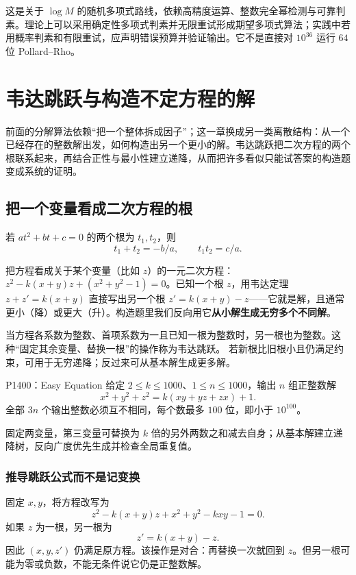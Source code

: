 \cost 这是关于 $\log M$ 的随机多项式路线，依赖高精度运算、整数完全幂检测与可靠判素。理论上可以采用确定性多项式判素并无限重试形成期望多项式算法；实践中若用概率判素和有限重试，应声明错误预算并验证输出。它不是直接对 $10^{36}$ 运行 $64$ 位 Pollard--Rho。



\chapter{韦达跳跃与构造不定方程的解}
\begin{chapterintro}[章节导读]
前面的分解算法依赖“把一个整体拆成因子”；这一章换成另一类离散结构：从一个已经存在的整数解出发，如何构造出另一个更小的解。韦达跳跃把二次方程的两个根联系起来，再结合正性与最小性建立递降，从而把许多看似只能试答案的构造题变成系统的证明。
\end{chapterintro}

\section{把一个变量看成二次方程的根}
若 $at^2+bt+c=0$ 的两个根为 $t_1,t_2$，则
\[
 t_1+t_2=-b/a,\qquad t_1t_2=c/a.
\]

\begin{tip}
把方程看成关于某个变量（比如 $z$）的一元二次方程：$z^2-k(x+y)z+(x^2+y^2-1)=0$。已知一个根 $z$，用韦达定理 $z+z'=k(x+y)$ 直接写出另一个根 $z'=k(x+y)-z$——它就是解，且通常更小（降）或更大（升）。构造题里我们反向用它\textbf{从小解生成无穷多个不同解}。
\end{tip}

当方程各系数为整数、首项系数为一且已知一根为整数时，另一根也为整数。这种“固定其余变量、替换一根”的操作称为韦达跳跃。
若新根比旧根小且仍满足约束，可用于无穷递降；反过来可从基本解生成更多解。

\begin{problem}{P1400：Easy Equation}
给定 $2\le k\le1000$、$1\le n\le1000$，输出 $n$ 组正整数解
\[
 x^2+y^2+z^2=k(xy+yz+zx)+1.
\]
全部 $3n$ 个输出整数必须互不相同，每个数最多 $100$ 位，即小于 $10^{100}$。
\end{problem}
\hint 固定两变量，第三变量可替换为 $k$ 倍的另外两数之和减去自身；从基本解建立递降树，反向广度优先生成并检查全局重复值。


\subsection{推导跳跃公式而不是记变换}
固定 $x,y$，将方程改写为
\[
 z^2-k(x+y)z+x^2+y^2-kxy-1=0.
\]
如果 $z$ 为一根，另一根为
\[
 z'=k(x+y)-z.
\]
因此 $(x,y,z')$ 仍满足原方程。该操作是对合：再替换一次就回到 $z$。但另一根可能为零或负数，不能无条件说它仍是正整数解。

